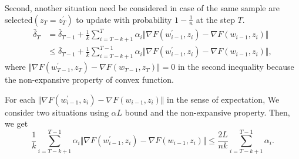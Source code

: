 Second, another situation need be considered in case of the same sample are selected$(z_{T}=z_{T}^{\prime})$ to update with probability $1-\frac{1}{n}$ at the step $T$. 
\begin{equation}
  \begin{aligned}
   \bar{\delta}_{T} &= \bar{\delta}_{T-1} + \frac{1}{k}\sum_{i=T-k+1}^{T} \alpha_i \Vert\nabla F(w^{\prime}_{i-1},z_i) - \nabla F(w_{i-1},z_i) \Vert \\
   &\leq \bar{\delta}_{T-1} + \frac{1}{k}\sum_{i=T-k+1}^{T-1} \alpha_i\Vert\nabla F(w^{\prime}_{i-1},z_i) - \nabla F(w_{i-1},z_i) \Vert ,
  \end{aligned}
 \end{equation}
where $\Vert\nabla F(w^{\prime}_{T-1},z_T)-\nabla F(w_{T-1},z_T)\Vert=0$ in the second inequality because the non-expansive property of convex function.

For each $\Vert\nabla F(w^{\prime}_{i-1},z_i)-\nabla F(w_{i-1},z_i)\Vert$ in the sense of expectation, We consider two situations using $\alpha L$ bound and the non-expansive property. Then, we get  
  \begin{equation}
    \frac{1}{k}\sum_{i=T-k+1}^{T-1}\alpha_i \Vert\nabla F(w^{\prime}_{i-1},z_i) - \nabla F(w_{i-1},z_i) \Vert \leq \frac{2L}{nk}\sum_{i=T-k+1}^{T-1}\alpha_i.
 \end{equation}

